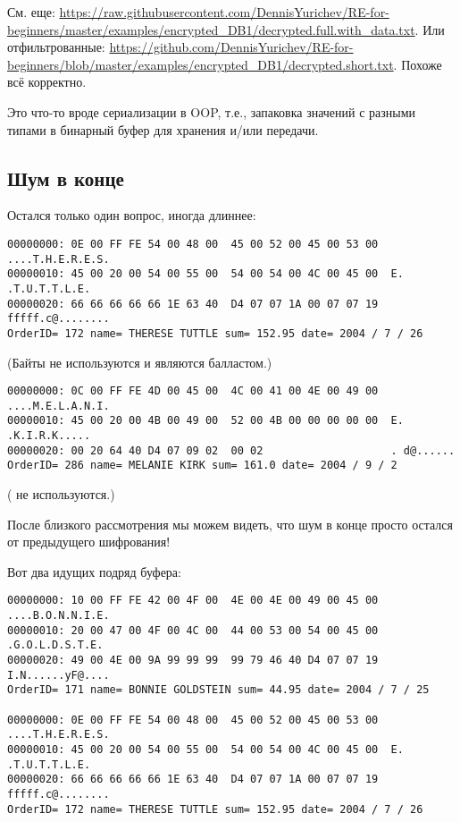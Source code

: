 См. еще: \url{https://raw.githubusercontent.com/DennisYurichev/RE-for-beginners/master/examples/encrypted_DB1/decrypted.full.with_data.txt}.
Или отфильтрованные: \url{https://github.com/DennisYurichev/RE-for-beginners/blob/master/examples/encrypted_DB1/decrypted.short.txt}.
Похоже всё корректно.

Это что-то вроде сериализации в \ac{OOP}, т.е., запаковка значений с разными типами в бинарный буфер для хранения и/или
передачи.

\subsection{Шум в конце}

Остался только один вопрос, иногда  длиннее:

\begin{lstlisting}
00000000: 0E 00 FF FE 54 00 48 00  45 00 52 00 45 00 53 00  ....T.H.E.R.E.S.
00000010: 45 00 20 00 54 00 55 00  54 00 54 00 4C 00 45 00  E. .T.U.T.T.L.E.
00000020: 66 66 66 66 66 1E 63 40  D4 07 07 1A 00 07 07 19  fffff.c@........
OrderID= 172 name= THERESE TUTTLE sum= 152.95 date= 2004 / 7 / 26
\end{lstlisting}

(Байты  не используются и являются балластом.)

\begin{lstlisting}
00000000: 0C 00 FF FE 4D 00 45 00  4C 00 41 00 4E 00 49 00  ....M.E.L.A.N.I.
00000010: 45 00 20 00 4B 00 49 00  52 00 4B 00 00 00 00 00  E. .K.I.R.K.....
00000020: 00 20 64 40 D4 07 09 02  00 02                    . d@......
OrderID= 286 name= MELANIE KIRK sum= 161.0 date= 2004 / 9 / 2
\end{lstlisting}

( не используются.)

После близкого рассмотрения мы можем видеть, что шум в конце  просто остался от предыдущего
шифрования!

Вот два идущих подряд буфера:

\begin{lstlisting}
00000000: 10 00 FF FE 42 00 4F 00  4E 00 4E 00 49 00 45 00  ....B.O.N.N.I.E.
00000010: 20 00 47 00 4F 00 4C 00  44 00 53 00 54 00 45 00   .G.O.L.D.S.T.E.
00000020: 49 00 4E 00 9A 99 99 99  99 79 46 40 D4 07 07 19  I.N......yF@....
OrderID= 171 name= BONNIE GOLDSTEIN sum= 44.95 date= 2004 / 7 / 25

00000000: 0E 00 FF FE 54 00 48 00  45 00 52 00 45 00 53 00  ....T.H.E.R.E.S.
00000010: 45 00 20 00 54 00 55 00  54 00 54 00 4C 00 45 00  E. .T.U.T.T.L.E.
00000020: 66 66 66 66 66 1E 63 40  D4 07 07 1A 00 07 07 19  fffff.c@........
OrderID= 172 name= THERESE TUTTLE sum= 152.95 date= 2004 / 7 / 26
\end{lstlisting}

